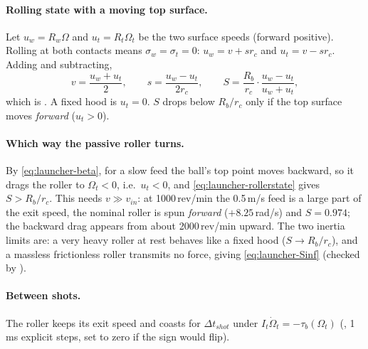\paragraph{Rolling state with a moving top surface.} Let $u_w = R_w\Omega$ and $u_t = R_t\Omega_t$ be the
two surface speeds (forward positive). Rolling at both contacts means $\sigma_w = \sigma_t = 0$:
$u_w = v + s r_c$ and $u_t = v - s r_c$. Adding and subtracting,
\begin{equation}
  v = \frac{u_w + u_t}{2}, \qquad s = \frac{u_w - u_t}{2 r_c}, \qquad
  S = \frac{R_b}{r_c}\cdot\frac{u_w - u_t}{u_w + u_t},
  \label{eq:launcher-rollerstate}
\end{equation}
which is . A fixed hood is $u_t = 0$. $S$ drops below $R_b/r_c$ only if the top
surface moves \emph{forward} ($u_t > 0$).

\paragraph{Which way the passive roller turns.} By \eqref{eq:launcher-beta}, for a slow feed the ball's top
point moves backward, so it drags the roller to $\Omega_t < 0$, i.e.\ $u_t < 0$, and
\eqref{eq:launcher-rollerstate} gives $S > R_b/r_c$. This needs $v \gg v_{in}$: at
1000\,\unit{rev/min}\assumed{} the 0.5\,\unit{m/s}\assumed{} feed is a large part of the exit speed, the nominal
roller is spun \emph{forward} ($+8.25$\,\unit{rad/s}\predicted) and $S = 0.974$\predicted; the backward drag
appears from about 2000\,\unit{rev/min}\predicted{} upward. The two inertia limits are: a very heavy roller at rest
behaves like a fixed hood ($S \to R_b/r_c$), and a massless frictionless roller transmits no force, giving
\eqref{eq:launcher-Sinf} (checked by ).

\paragraph{Between shots.} The roller keeps its exit speed and coasts for $\Delta t_{shot}$ under
$I_t\dot\Omega_t = -\tau_b(\Omega_t)$ (, 1\,\unit{ms}\assumed{} explicit steps, set to zero
if the sign would flip).

